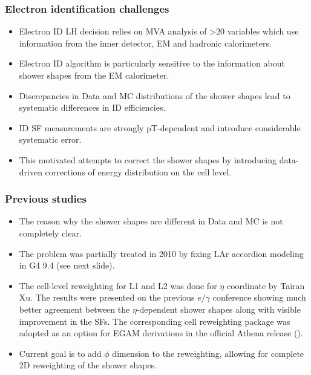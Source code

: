 \documentclass{beamer}
\begin{document}
\begin{frame}
\frametitle{Electron identification challenges}

\begin{itemize}
\item Electron ID LH decision relies on MVA analysis of >20 variables which use information from the inner detector, EM and hadronic calorimeters.
\item Electron ID algorithm is particularly sensitive to the information about shower shapes from the EM calorimeter.
\item Discrepancies in Data and MC distributions of the shower shapes lead to systematic differences in ID efficiencies. 
\item ID SF measurements are strongly pT-dependent and introduce considerable systematic error.
\item This motivated attempts to correct the shower shapes by introducing data-driven corrections of energy distribution on the cell level.
\end{itemize}

\end{frame}
\begin{frame}
\frametitle{Previous studies}

\begin{itemize}
\item The reason why the shower shapes are different in Data and MC is not completely clear. 
\item The problem was partially treated in 2010 by fixing LAr accordion modeling in G4 9.4 (see next slide).
\item The cell-level reweighting for L1 and L2 was done for $\eta$ coordinate by Tairan Xu. The results were presented on the previous $e/\gamma$ conference showing much better agreement between the $\eta$-dependent shower shapes along with visible improvement in the SFs. The corresponding cell reweighting package was adopted as an option for EGAM derivations in the official Athena release 
(\href{https://indico.cern.ch/event/649891/contributions/2746591/attachments/1553712/2442739/elecSwReweight.pdf}{\color{blue}{Tairan's talk}}).
\item Current goal is to add $\phi$ dimension to the reweighting, allowing for complete 2D reweighting of the shower shapes.
\end{itemize}

\end{frame}
\end{document}
